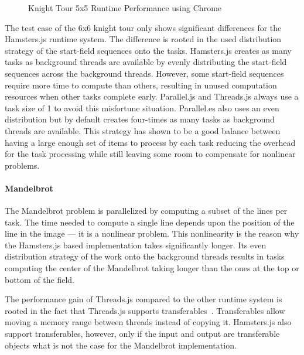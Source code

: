 \begin{figure}
	\centering
	
	\caption{Knight Tour 5x5 Runtime Performance using Chrome}
	\label{fig:runtime-performance-chrome}
\end{figure}

The test case of the 6x6 knight tour only shows significant differences for the Hamsters.js runtime system. The difference is rooted in the used distribution strategy of the start-field sequences onto the tasks. Hamsters.js creates as many tasks as background threads are available by evenly distributing the start-field sequences across the background threads. However, some start-field sequences require more time to compute than others, resulting in unused computation resources when other tasks complete early. Parallel.js and Threads.js always use a task size of 1 to avoid this misfortune situation. Parallel.es also uses an even distribution but by default creates four-times as many tasks as background threads are available. This strategy has shown to be a good balance between having a large enough set of items to process by each task reducing the overhead for the task processing while still leaving some room to compensate for nonlinear problems. 

\paragraph{Mandelbrot}
The Mandelbrot problem is parallelized by computing a subset of the lines per task. The time needed to compute a single line depends upon the position of the line in the image --- it is a nonlinear problem. This nonlinearity is the reason why the Hamsters.js based implementation takes significantly longer. Its even distribution strategy of the work onto the background threads results in tasks computing the center of the Mandelbrot taking longer than the ones at the top or bottom of the field. 

The performance gain of Threads.js compared to the other runtime system is rooted in the fact that Threads.js supports transferables~\cite[Section 2.7.4]{w3cHtml5}. Transferables allow moving a memory range between threads instead of copying it. Hamsters.js also support transferables, however, only if the input and output are transferable objects what is not the case for the Mandelbrot implementation.

